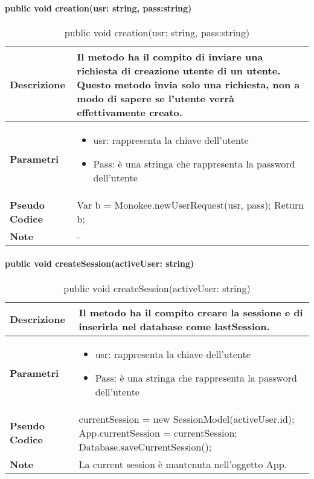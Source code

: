 \paragraph{public void creation(usr: string, pass:string)}
\begin{center}
    \begin{longtable}{|p{3cm}|p{9cm}|}%
    \caption{public void creation(usr: string, pass:string)}
    \endfirsthead
    \endhead
    \hline
    \textbf{Descrizione} & Il metodo ha il compito di inviare una richiesta di creazione utente di un utente. Questo metodo invia solo una richiesta, non a modo di sapere se l’utente verrà effettivamente creato.\\
    \hline
    \textbf{Parametri} &      
    \begin{itemize}
        \item  usr: rappresenta la chiave dell’utente
        \item Pass: è una stringa che rappresenta la password dell’utente
    \end{itemize}
    \\
    \hline
    \textbf{Pseudo Codice} & 
    Var b = Monokee.newUserRequest(usr, pass);\newline
    Return b;\newline
    \\
    \hline
    \textbf{Note} & 
    -
    \\
    \hline
    \end{longtable}
    \end{center}


\paragraph{public void createSession(activeUser: string)}
\begin{center}
    \begin{longtable}{|p{3cm}|p{9cm}|}%
    \caption{public void createSession(activeUser: string)}
    \endfirsthead
    \endhead
    \hline
    \textbf{Descrizione} & Il metodo ha il compito creare la sessione e di inserirla nel database come lastSession.\\
    \hline
    \textbf{Parametri} &      
    \begin{itemize}
        \item  usr: rappresenta la chiave dell’utente
        \item Pass: è una stringa che rappresenta la password dell’utente
    \end{itemize}
    \\
    \hline
    \textbf{Pseudo Codice} & 
    currentSession = new SessionModel(activeUser.id);\newline
    App.currentSession = currentSession;\newline
    Database.saveCurrentSession();\newline
    \\
    \hline
    \textbf{Note} & 
    La current session è mantenuta nell’oggetto App.
    \\
    \hline
    \end{longtable}
    \end{center}



